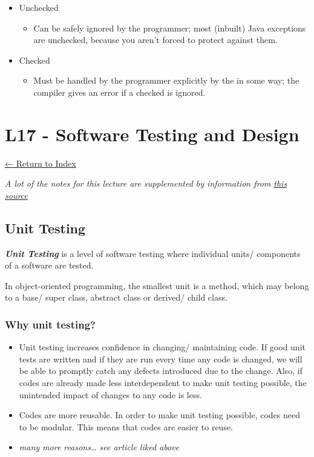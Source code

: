 \documentclass[]{article}
\providecommand{\tightlist}{%
  \setlength{\itemsep}{0pt}\setlength{\parskip}{0pt}}
\begin{document}
\begin{itemize}
\tightlist
\item
  Unchecked

  \begin{itemize}
  \tightlist
  \item
    Can be safely ignored by the programmer; most (inbuilt) Java
    exceptions are unchecked, because you aren't forced to protect
    against them.
  \end{itemize}
\item
  Checked

  \begin{itemize}
  \tightlist
  \item
    Must be handled by the programmer explicitly by the in some way; the
    compiler gives an error if a checked is ignored.
  \end{itemize}
\end{itemize}

\hypertarget{l17---software-testing-and-design}{%
\section{L17 - Software Testing and
Design}\label{l17---software-testing-and-design}}

\protect\hyperlink{table-of-contents}{← Return to Index}

\emph{A lot of the notes for this lecture are supplemented by
information from
\href{softwaretestingfundamentals.com/unit-testing/}{this source}}

\hypertarget{unit-testing}{%
\subsection{Unit Testing}\label{unit-testing}}

\textbf{\emph{Unit Testing}} is a level of software testing where
individual units/ components of a software are tested.

In object-oriented programming, the smallest unit is a method, which may
belong to a base/ super class, abstract class or derived/ child class.

\hypertarget{why-unit-testing}{%
\subsubsection{Why unit testing?}\label{why-unit-testing}}

\begin{itemize}
\tightlist
\item
  Unit testing increases confidence in changing/ maintaining code. If
  good unit tests are written and if they are run every time any code is
  changed, we will be able to promptly catch any defects introduced due
  to the change. Also, if codes are already made less interdependent to
  make unit testing possible, the unintended impact of changes to any
  code is less.
\item
  Codes are more reusable. In order to make unit testing possible, codes
  need to be modular. This means that codes are easier to reuse.
\item
  \emph{many more reasons\ldots{} see article liked above}
\end{itemize}
\end{document}
